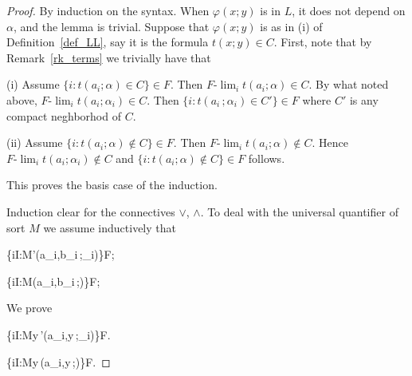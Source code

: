 \documentclass[11pt,oneside]{amsart}
\newcommand*{\TakeFourierOrnament}[1]{{%
\fontencoding{U}\fontfamily{futs}\selectfont\char#1}}
\renewcommand*{\danger}{\TakeFourierOrnament{66}}
\theoremstyle{plain}
\theoremstyle{remark}
\begin{document}
\begin{proof}
  By induction on the syntax.
  When $\varphi(x;y)$ is in $L$, it does not depend on $\alpha$, and the lemma is trivial.
  Suppose that $\varphi(x;y)$ is as in (i) of Definition~\ref{def_LL}, say it is the formula $t(x;y)\in C$.
  First, note that by Remark~\ref{rk_terms} we trivially have that

  
  (\textsf{i})
  Assume $\{i:t(a_i;\alpha)\in C\}\in F$.
  Then $F\mbox{-}\lim_i t(a_i;\alpha)\in C$.
  By what noted above, $F\mbox{-}\lim_i t(a_i;\alpha_i)\in C$.
  Then $\{i:t(a_i\,;\alpha_i)\in C'\}\in F$ where $C'$ is any compact neghborhod of $C$.

  (\textsf{ii})
  Assume $\{i:t(a_i;\alpha)\notin C\}\in F$.
  Then $F\mbox{-}\lim_i t(a_i;\alpha)\notin C$.
  Hence $F\mbox{-}\lim_i t(a_i;\alpha_i)\notin C$ and  $\{i:t(a_i;\alpha)\notin C\}\in F$ follows.
  
  This proves the basis case of the induction.

  Induction clear for the connectives $\vee$, $\wedge$.
  To deal with the universal quantifier of sort $M$ we assume inductively that

  {\Rightarrow}
  {\big\{i\in I:{\EuScript M}\models\varphi'(a_i,b_i\,;\alpha_i)\big\}\in F};

  {\Rightarrow}
  {\big\{i\in I:{\EuScript M}\models\varphi(a_i,b_i\,;\alpha)\big\}\in F};


  We prove

  {\Rightarrow}
  {\big\{i\in I:{\EuScript M}\models\forall y\,\varphi'(a_i,y\,;\alpha_i)\big\}\in F}.

  {\Rightarrow}
  {\big\{i\in I:{\EuScript M}\models\forall y\,\varphi(a_i,y\,;\alpha)\big\}\in F}.



\end{proof}
\end{document}
